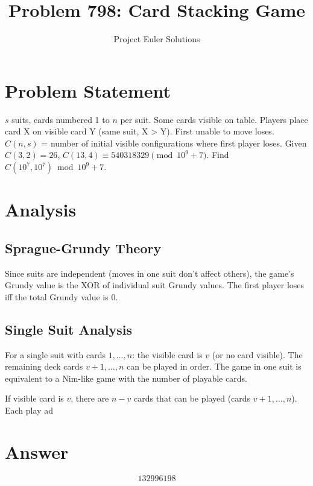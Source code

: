 \documentclass[11pt]{article}
\title{Problem 798: Card Stacking Game}
\author{Project Euler Solutions}
\date{}
\begin{document}
\maketitle
\section{Problem Statement}
$s$ suits, cards numbered 1 to $n$ per suit. Some cards visible on table. Players place card X on visible card Y (same suit, X > Y). First unable to move loses. $C(n,s)$ = number of initial visible configurations where first player loses. Given $C(3,2)=26$, $C(13,4) \equiv 540318329 \pmod{10^9+7}$. Find $C(10^7, 10^7) \bmod 10^9+7$.
\section{Analysis}
\subsection*{Sprague-Grundy Theory}

Since suits are independent (moves in one suit don't affect others), the game's Grundy value is the XOR of individual suit Grundy values. The first player loses iff the total Grundy value is 0.

\subsection*{Single Suit Analysis}

For a single suit with cards $1, \ldots, n$: the visible card is $v$ (or no card visible). The remaining deck cards $v+1, \ldots, n$ can be played in order. The game in one suit is equivalent to a Nim-like game with the number of playable cards.

If visible card is $v$, there are $n - v$ cards that can be played (cards $v+1, \ldots, n$). Each play ad
\section{Answer}

\[
\boxed{132996198}
\]
\end{document}
